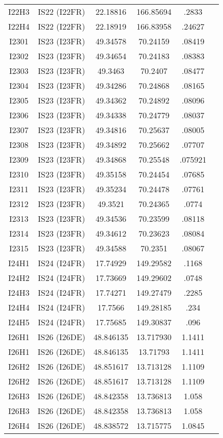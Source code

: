 \documentclass[a4paper, 10pt]{report}
\begin{document}
{\begin{center}
\begin{tabular}{|c|c|c|c|c|c|}
I22H3&	IS22 (I22FR)&	 	22.18816&	166.85694&	.2833\\
I22H4&	IS22 (I22FR)&	 	22.18919&	166.83958&	.24627\\
I2301&	IS23 (I23FR)&	 	49.34578&	70.24159&	.08419\\
I2302&	IS23 (I23FR)&	 	49.34654&	70.24183&	.08383\\
I2303&	IS23 (I23FR)&	 	49.3463&	70.2407&	.08477\\
I2304&	IS23 (I23FR)&	 	49.34286&	70.24868&	.08165\\
I2305&	IS23 (I23FR)&	 	49.34362&	70.24892&	.08096\\
I2306&	IS23 (I23FR)&	 	49.34338&	70.24779&	.08037\\
I2307&	IS23 (I23FR)&	 	49.34816&	70.25637&	.08005\\
I2308&	IS23 (I23FR)&	 	49.34892&	70.25662&	.07707\\
I2309&	IS23 (I23FR)&	 	49.34868&	70.25548&	.075921\\
I2310&	IS23 (I23FR)&	 	49.35158&	70.24454&	.07685\\
I2311&	IS23 (I23FR)&	 	49.35234&	70.24478&	.07761\\
I2312&	IS23 (I23FR)&	 	49.3521&	70.24365&	.0774\\
I2313&	IS23 (I23FR)&	 	49.34536&	70.23599&	.08118\\
I2314&	IS23 (I23FR)&	 	49.34612&	70.23623&	.08084\\
I2315&	IS23 (I23FR)&	 	49.34588&	70.2351&	.08067\\
I24H1&	IS24 (I24FR)&	 	17.74929&	149.29582&	.1168\\
I24H2&	IS24 (I24FR)&	 	17.73669&	149.29602&	.0748\\
I24H3&	IS24 (I24FR)&	 	17.74271&	149.27479&	.2285\\
I24H4&	IS24 (I24FR)&	 	17.7566&	149.28185&	.234\\
I24H5&	IS24 (I24FR)&	 	17.75685&	149.30837&	.096\\
I26H1&	IS26 (I26DE)&	 	48.846135&	13.717930&	1.1411\\
I26H1&	IS26 (I26DE)&	 	48.846135&	13.71793&	1.1411\\
I26H2&	IS26 (I26DE)&	 	48.851617&	13.713128&	1.1109\\
I26H2&	IS26 (I26DE)&	 	48.851617&	13.713128&	1.1109\\
I26H3&	IS26 (I26DE)&	 	48.842358&	13.736813&	1.058\\
I26H3&	IS26 (I26DE)&	 	48.842358&	13.736813&	1.058\\
I26H4&	IS26 (I26DE)&	 	48.838572&	13.715775&	1.0845\\

\end{tabular}
\end{center}}
\end{document}
